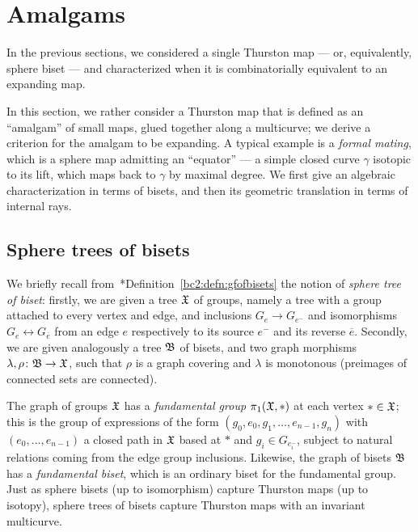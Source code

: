 \documentclass{amsart}
\begin{document}
\section{Amalgams}\label{ss:matings}
In the previous sections, we considered a single Thurston map --- or,
equivalently, sphere biset --- and characterized when it is
combinatorially equivalent to an expanding map.

In this section, we rather consider a Thurston map that is defined as
an ``amalgam'' of small maps, glued together along a multicurve; we
derive a criterion for the amalgam to be expanding. A typical example
is a \emph{formal mating}, which is a sphere map admitting an
``equator'' --- a simple closed curve $\gamma$ isotopic to its lift,
which maps back to $\gamma$ by maximal degree. We first give an
algebraic characterization in terms of bisets, and then its geometric
translation in terms of internal rays.

\subsection{Sphere trees of bisets}
We briefly recall
from~\cite{bartholdi-dudko:bc2}*{Definition~\ref{bc2:defn:gfofbisets}}
the notion of \emph{sphere tree of biset}: firstly, we are given a
tree ${\mathfrak X}$ of groups, namely a tree with a group attached to every
vertex and edge, and inclusions $G_e\to G_{e^-}$ and isomorphisms
$G_e\leftrightarrow G_{\overline e}$ from an edge $e$ respectively to
its source $e^-$ and its reverse $\overline e$. Secondly, we are given
analogously a tree ${\mathfrak B}$ of bisets, and two graph morphisms
$\lambda,\rho\colon{\mathfrak B}\to{\mathfrak X}$, such that $\rho$ is a graph
covering and $\lambda$ is monotonous (preimages of connected sets are
connected).

The graph of groups ${\mathfrak X}$ has a \emph{fundamental group}
$\pi_1({\mathfrak X},*)$ at each vertex $*\in{\mathfrak X}$; this is the group of
expressions of the form
$(g_0,e_0,g_1,\dots,e_{n-1},g_n)$ with
$(e_0,\dots,e_{n-1})$ a closed path in ${\mathfrak X}$ based at $*$ and
$g_i\in G_{e_i^-}$, subject to natural relations coming from the
edge group inclusions. Likewise, the graph of bisets ${\mathfrak B}$ has
a \emph{fundamental biset}, which is an ordinary biset for the
fundamental group. Just as sphere bisets (up to isomorphism) capture
Thurston maps (up to isotopy), sphere trees of bisets capture Thurston
maps with an invariant multicurve.
\end{document}
